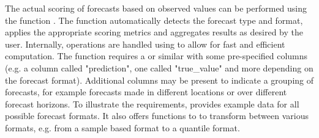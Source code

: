 \documentclass[article,shortnames]{jss}
\newcommand{\fct}[1]{\code{#1()}}
\begin{document}
The actual scoring of forecasts based on observed values can be performed using the function \fct{eval\_forecasts}. The function automatically detects the forecast type and format, applies the appropriate scoring metrics and aggregates results as desired by the user. Internally, operations are handled using  to allow for fast and efficient computation. The function requires a  or similar with some pre-specified columns (e.g. a column called "prediction", one called "true\_value" and more depending on the forecast format). Additional columns may be present to indicate a grouping of forecasts, for example forecasts made in different locations or over different forecast horizons. To illustrate the requirements,  provides example data for all possible forecast formats. It also offers functions to to transform between various formats, e.g. from a sample based format to a quantile format. 
\end{document}
